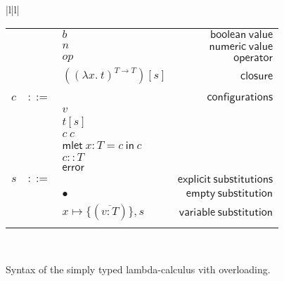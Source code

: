 \documentclass[preprint,authoryear,sort&compress,9pt,nocopyrightspace]{article}
\newcommand{\conf}[2][s]{(#2)[#1]}
\newcommand{\subxD}{x \mapsto \{(\overline{v:T})\},s}
\newcommand{\ascrip}[1]{#1::T}
\newcommand{\oletP}[3]{\mathsf{mlet} \ x : #1 = #2 \ \mathsf{in}  \ #3}
\newcommand{\absST}[2]{(\lambda #1. \ #2)^{T \to T}}
\newcommand{\negacion}[1]{\mathsf{not} \ #1}
\newcommand{\suma}[1]{\mathsf{add1} \ #1}
\begin{document}
\begin{figure}
\begin{small}
\begin{center}
\begin{tabular}{|l|l|}
\begin{tabular}{l c l r}
&&$b$&$\mathsf {boolean \ value}$\\
&&$n$&$\mathsf{numeric \ value} $\\
&&$op$&$\mathsf{operator}$\\
&&$\conf{\absST {x}{t}}$&$\mathsf{closure}$\\
&&&\\
$c$&$::=$&&$\mathsf {configurations}$\\
&&$v$&\\
&&$t[s]$&\\
&&$c \ c $&\\
&&$\oletP {T}{c}{c}$&\\
&&$\ascrip{c}$&\\
&&$\mathsf{error}$&\\
$s$&$::=$&&$\mathsf {explicit \ substitutions}$\\
&&$ \bullet$&$\mathsf {empty \ substitution}$\\
&&$\subxD$&$\mathsf {variable \ substitution}$\\
&&&\\
\end{tabular}\\
\hline
\end{tabular}
\hspace*{-2cm}
\caption{Syntax of the simply typed lambda-calculus vith overloading.}
\label{figure:sencilla}
\end{center}
\end{small}
\end{figure}
\end{document}
